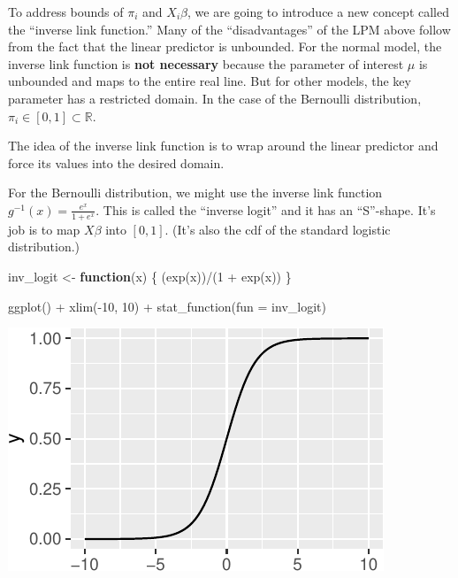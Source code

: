 \documentclass[
]{book}
\newenvironment{Shaded}{\begin{snugshade}}{\end{snugshade}}
\newcommand{\AttributeTok}[1]{\textcolor[rgb]{0.77,0.63,0.00}{#1}}
\newcommand{\ControlFlowTok}[1]{\textcolor[rgb]{0.13,0.29,0.53}{\textbf{#1}}}
\newcommand{\DecValTok}[1]{\textcolor[rgb]{0.00,0.00,0.81}{#1}}
\newcommand{\FunctionTok}[1]{\textcolor[rgb]{0.00,0.00,0.00}{#1}}
\newcommand{\NormalTok}[1]{#1}
\newcommand{\OtherTok}[1]{\textcolor[rgb]{0.56,0.35,0.01}{#1}}
\newcommand{\SpecialCharTok}[1]{\textcolor[rgb]{0.00,0.00,0.00}{#1}}
\begin{document}
To address bounds of \(\pi_i\) and \(X_i\beta\), we are going to
introduce a new concept called the ``inverse link function.'' Many of
the ``disadvantages'' of the LPM above follow from the fact that the
linear predictor is unbounded. For the normal model, the inverse link
function is \textbf{not necessary} because the parameter of interest
\(\mu\) is unbounded and maps to the entire real line. But for other
models, the key parameter has a restricted domain. In the case of the
Bernoulli distribution, \(\pi_i \in [0, 1] \subset \mathbb{R}\).

The idea of the inverse link function is to wrap around the linear
predictor and force its values into the desired domain.

For the Bernoulli distribution, we might use the inverse link function
\(g^{-1}(x) = \frac{e^x}{1 + e^x}\). This is called the ``inverse
logit'' and it has an ``S''-shape. It's job is to map \(X\beta\) into
\([0, 1]\). (It's also the cdf of the standard logistic distribution.)

\begin{Shaded}
\begin{Highlighting}[]
\NormalTok{inv\_logit }\OtherTok{\textless{}{-}} \ControlFlowTok{function}\NormalTok{(x) \{}
\NormalTok{  (}\FunctionTok{exp}\NormalTok{(x))}\SpecialCharTok{/}\NormalTok{(}\DecValTok{1} \SpecialCharTok{+} \FunctionTok{exp}\NormalTok{(x))}
\NormalTok{\}}

\FunctionTok{ggplot}\NormalTok{() }\SpecialCharTok{+} 
  \FunctionTok{xlim}\NormalTok{(}\SpecialCharTok{{-}}\DecValTok{10}\NormalTok{, }\DecValTok{10}\NormalTok{) }\SpecialCharTok{+} 
  \FunctionTok{stat\_function}\NormalTok{(}\AttributeTok{fun =}\NormalTok{ inv\_logit)}
\end{Highlighting}
\end{Shaded}

\includegraphics{03-02-bernoulli-model_files/figure-latex/unnamed-chunk-5-1.pdf}
\end{document}
